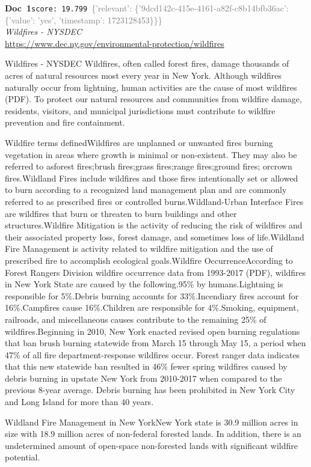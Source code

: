 \documentclass[a4paper,11pt]{article}
\begin{document}
\begin{docenv}
{\footnotesize\textcolor{doccolor}{\textbf{Doc~1}}}\hfill{\tiny\texttt{score:~19.799}}\ {\tiny\textcolor{gray}{\{'relevant': \{'9dcd142c-415e-4161-a82f-c8b14bfb36ac': \{'value': 'yes', 'timestamp': 1723128453\}\}\}}}\\[3pt]
{\small\textit{Wildfires - NYSDEC}}\\[2pt]
{\tiny\url{https://www.dec.ny.gov/environmental-protection/wildfires}}\\[4pt]
{\footnotesize Wildfires - NYSDEC
Wildfires, often called forest fires, damage thousands of acres of natural resources most every year in New York. Although wildfires naturally occur from lightning, human activities are the cause of most wildfires (PDF). To protect our natural resources and communities from wildfire damage, residents, visitors, and municipal jurisdictions must contribute to wildfire prevention and fire containment.

Wildfire terms definedWildfires are unplanned or unwanted fires burning vegetation in areas where growth is minimal or non-existent. They may also be referred to asforest fires;brush fires;grass fires;range fires;ground fires; orcrown fires.Wildland Fires include wildfires and those fires intentionally set or allowed to burn according to a recognized land management plan and are commonly referred to as prescribed fires or controlled burns.Wildland-Urban Interface Fires are wildfires that burn or threaten to burn buildings and other structures.Wildfire Mitigation is the activity of reducing the risk of wildfires and their associated property loss, forest damage, and sometimes loss of life.Wildland Fire Management is activity related to wildfire mitigation and the use of prescribed fire to accomplish ecological goals.Wildfire OccurrenceAccording to Forest Rangers Division wildfire occurrence data from 1993-2017 (PDF), wildfires in New York State are caused by the following.95\% by humans.Lightning is responsible for 5\%.Debris burning accounts for 33\%.Incendiary fires account for 16\%.Campfires cause 16\%.Children are responsible for 4\%.Smoking, equipment, railroads, and miscellaneous causes contribute to the remaining 25\% of wildfires.Beginning in 2010, New York enacted revised open burning regulations that ban brush burning statewide from March 15 through May 15, a period when 47\% of all fire department-response wildfires occur. Forest ranger data indicates that this new statewide ban resulted in 46\% fewer spring wildfires caused by debris burning in upstate New York from 2010-2017 when compared to the previous 8-year average. Debris burning has been prohibited in New York City and Long Island for more than 40 years.

Wildland Fire Management in New YorkNew York state is 30.9 million acres in size with 18.9 million acres of non-federal forested lands. In addition, there is an undetermined amount of open-space non-forested lands with significant wildfire potential.}
\end{docenv}
\end{document}
